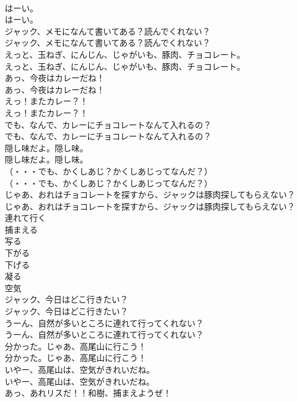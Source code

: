 \documentclass[8pt]{extreport}
\begin{document}
\begin{CJK}{UTF8}{min}
\\	はーい。	
\\	はーい。 
\\	ジャック、メモになんて書いてある？読んでくれない？	
\\	ジャック、メモになんて書いてある？読んでくれない？ 
\\	えっと、玉ねぎ、にんじん、じゃがいも、豚肉、チョコレート。	
\\	えっと、玉ねぎ、にんじん、じゃがいも、豚肉、チョコレート。 
\\	あっ、今夜はカレーだね！	
\\	あっ、今夜はカレーだね！ 
\\	えっ！またカレー？！	
\\	えっ！またカレー？！ 
\\	でも、なんで、カレーにチョコレートなんて入れるの？	
\\	でも、なんで、カレーにチョコレートなんて入れるの？ 
\\	隠し味だよ。隠し味。	
\\	隠し味だよ。隠し味。 
\\	（・・・でも、かくしあじ？かくしあじってなんだ？）	
\\	（・・・でも、かくしあじ？かくしあじってなんだ？） 
\\	じゃあ、おれはチョコレートを探すから、ジャックは豚肉探してもらえない？	
\\	じゃあ、おれはチョコレートを探すから、ジャックは豚肉探してもらえない？ 
\\	連れて行く
\\	捕まえる
\\	写る
\\	下がる
\\	下げる
\\	凝る
\\	空気
\\	ジャック、今日はどこ行きたい？	
\\	ジャック、今日はどこ行きたい？ 
\\	うーん、自然が多いところに連れて行ってくれない？	
\\	うーん、自然が多いところに連れて行ってくれない？ 
\\	分かった。じゃあ、高尾山に行こう！	
\\	分かった。じゃあ、高尾山に行こう！ 
\\	いやー、高尾山は、空気がきれいだね。	
\\	いやー、高尾山は、空気がきれいだね。 
\\	あっ、あれリスだ！！和樹、捕まえようぜ！	

\end{CJK}
\end{document}
